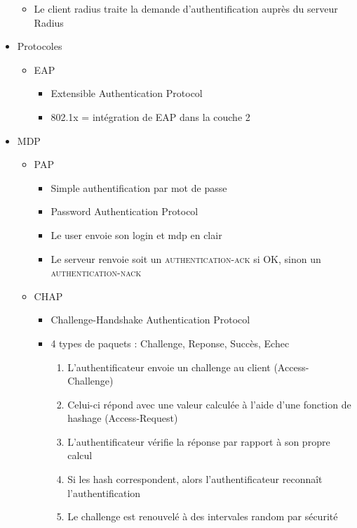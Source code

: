 \documentclass[a4paper]{article}
\begin{document}
\begin{itemize}[label = \textbullet, font = \Large]
\begin{itemize}[label=, font=\scriptsize]
          \item Le client radius traite la demande d'authentification auprès du serveur Radius
        \end{itemize}
        \item Protocoles
        \begin{itemize}
          \item EAP
          \begin{itemize}[label=, font=\scriptsize]
            \item Extensible Authentication Protocol
            \item 802.1x = intégration de EAP dans la couche 2
          \end{itemize}
        \end{itemize}
        \item MDP
        \begin{itemize}[label=, font=\scriptsize]
          \item PAP
          \begin{itemize}
            \item Simple authentification par mot de passe
            \item Password Authentication Protocol
            \item Le user envoie son login et mdp en clair
            \item Le serveur renvoie soit un \textsc{authentication-ack} si OK, sinon un \textsc{authentication-nack}
          \end{itemize}
          \item CHAP
          \begin{itemize}
            \item Challenge-Handshake Authentication Protocol
            \item 4 types de paquets : Challenge, Reponse, Succès, Echec
            \begin{enumerate}
              \item L'authentificateur envoie un challenge au client (Access-Challenge)
              \item Celui-ci répond avec une valeur calculée à l'aide d'une fonction de hashage (Access-Request)
              \item L'authentificateur vérifie la réponse par rapport à son propre calcul
              \item Si les hash correspondent, alors l'authentificateur reconnaît l'authentification
              \item Le challenge est renouvelé à des intervales random par sécurité

\end{enumerate}
\end{itemize}
\end{itemize}
\end{itemize}
\end{document}

